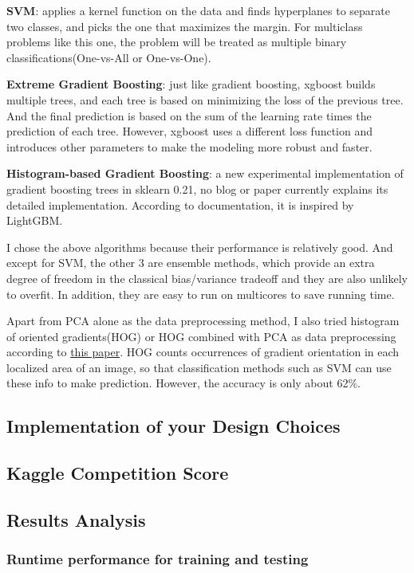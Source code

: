 \documentclass[12pt]{article}
\begin{document}
\textbf{SVM}: applies a kernel function on the data and finds hyperplanes to separate two classes, and picks the one that maximizes the margin. For multiclass problems like this one, the problem will be treated as multiple binary classifications(One-vs-All or One-vs-One).

\textbf{Extreme Gradient Boosting}: just like gradient boosting, xgboost builds multiple trees, and each tree is based on minimizing the loss of the previous tree. And the final prediction is based on the sum of the learning rate times the prediction of each tree. However, xgboost uses a different loss function and introduces other parameters to make the modeling more robust and faster.

\textbf{Histogram-based Gradient Boosting}: a new experimental implementation of gradient boosting trees in sklearn 0.21, no blog or paper currently explains its detailed implementation. According to documentation, it is inspired by LightGBM.

I chose the above algorithms because their performance is relatively good. And except for SVM, the other 3 are ensemble methods, which provide an extra degree of freedom in the classical bias/variance tradeoff and they are also unlikely to overfit. In addition, they are easy to run on multicores to save running time.

Apart from PCA alone as the data preprocessing method, I also tried histogram of oriented gradients(HOG) or HOG combined with PCA as data preprocessing according to \href{https://www.ijitee.org/wp-content/uploads/papers/v8i5/E3075038519.pdf}{this paper}. HOG counts occurrences of gradient orientation in each localized area of an image, so that classification methods such as SVM can use these info to make prediction. However, the accuracy is only about 62\%.

\subsection{Implementation of your Design Choices}

\subsection{Kaggle Competition Score}

\subsection{Results Analysis}
\subsubsection{Runtime performance for training and testing}
\end{document}
